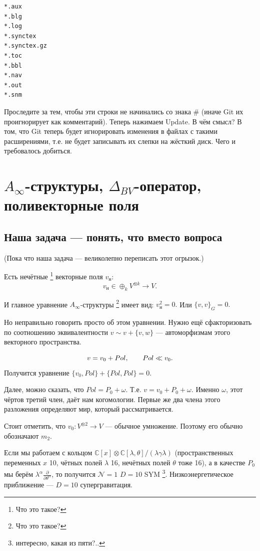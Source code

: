 \documentclass[11pt]{article}
\theoremstyle{remark}
\theoremstyle{definition}
\newcommand{\que}[1]{\footnote{\textcolor[rgb]{0.38,0.69,0.82}{#1}}}
\begin{document}
\begin{verbatim}
*.aux
*.blg
*.log
*.synctex
*.synctex.gz
*.toc
*.bbl
*.nav
*.out
*.snm
\end{verbatim}

Проследите за тем, чтобы эти строки не начинались со знака \# (иначе Git их проигнорирует как комментарий). Теперь нажимаем Update. В чём смысл? В том, что Git теперь будет игнорировать изменения в файлах с такими расширениями, т.е. не будет записывать их слепки на жёсткий диск. Чего и требовалось добиться.

\newpage

\section{$A_{\infty}$-структуры, $\Delta_{BV}$-оператор, поливекторные поля}

\subsection{Наша задача --- понять, что вместо вопроса}

(Пока что наша задача --- великолепно переписать этот огрызок.)

Есть нечётные \que{Что это такое?} векторные поля $v_{\text{н}}$: $$v_{\text{н}} \in \oplus_k V^{\otimes k} \to V.$$

И главное уравнение $A_{\infty}$-структуры \que{Что это такое?} имеет вид: $v_{\text{н}}^2 = 0.$ Или $\{v,v\}_G = 0.$

Но неправильно говорить просто об этом уравнении. Нужно ещё сфакторизовать по соотношению эквивалентности $v\sim v + \{v,w\}$ --- автоморфизмам этого векторного пространства.

$$v = v_0 + Pol, \hskip 20 pt Pol \ll v_0.$$ Получится уравнение $\{ v_0, Pol \} + \{ Pol, Pol \} = 0.$

Далее, можно сказать, что $Pol = P_0 + \omega$. Т.е. $v = v_0 + P_0 + \omega$. Именно $\omega$, этот чёртов третий член, даёт нам когомологии. Первые же два члена этого разложения определяют мир, который рассматривается.

Стоит отметить, что $v_0: V^{\otimes 2} \to V$ --- обычное умножение. Поэтому его обычно обозначают $m_2$.

Если мы работаем с кольцом $\mathbb{C}[x] \otimes \mathbb{C}[\lambda, \theta] / (\lambda \gamma \lambda)$ (пространственных переменных $x$ 10, чётных полей $\lambda$ 16, нечётных полей $\theta$ тоже 16), а в качестве $P_0$ мы берём $\lambda^{\alpha} \frac{\partial}{\partial \theta^{\alpha}}$, то получится $\mathcal{N} = 1$ $D=10$ SYM \que{интересно, какая из пяти?..}. Низкоэнергетическое приближение --- $D=10$ супергравитация.
\end{document}
